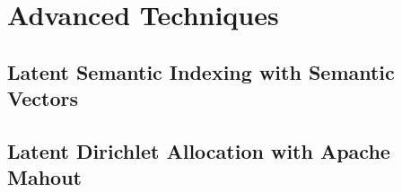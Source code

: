 \chapter{Advanced Techniques}
\label{chap-advances_techniques}

\section{Latent Semantic Indexing with Semantic Vectors}

\section{Latent Dirichlet Allocation with Apache Mahout}

